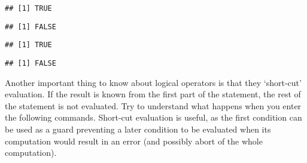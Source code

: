\documentclass[paper=a4,10pt,div=17,headsepline,BCOR=12mm,twoside,open=right]{scrbook}\usepackage{knitr}
\begin{document}
\begin{knitrout}\footnotesize
{}\color{fgcolor}\begin{kframe}
\begin{alltt}
\end{alltt}
\begin{verbatim}
## [1] TRUE
\end{verbatim}
\begin{alltt}
\end{alltt}
\begin{verbatim}
## [1] FALSE
\end{verbatim}
\begin{alltt}
 \hlopt{&} 
\end{alltt}
\begin{verbatim}
## [1] TRUE
\end{verbatim}
\begin{alltt}
 \hlopt{&} 
\end{alltt}
\begin{verbatim}
## [1] FALSE
\end{verbatim}
\end{kframe}
\end{knitrout}

Another important thing to know about logical operators is that they `short-cut' evaluation. If the result is known from the first part of the statement, the rest of the statement is not evaluated. Try to understand what happens when you enter the following commands. Short-cut evaluation is useful, as the first condition can be used as a guard preventing a later condition to be evaluated when its computation would result in an error (and possibly abort of the whole computation).
\end{document}
